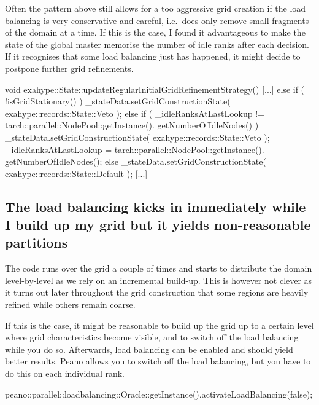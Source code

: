 \begin{remark}
Often the pattern above still allows for a too aggressive grid creation if the
load balancing is very conservative and careful, i.e.~does only remove small
fragments of the domain at a time. If this is the case, I found it advantageous
to make the state of the global master memorise the number of idle ranks after
each decision. If it recognises that some load balancing just has happened, it
might decide to postpone further grid refinements.
  \begin{code}
void exahype::State::updateRegularInitialGridRefinementStrategy() {
  [...]
  else if ( !isGridStationary() ) {
    _stateData.setGridConstructionState( exahype::records::State::Veto );
  }
  else if (
    _idleRanksAtLastLookup != tarch::parallel::NodePool::getInstance().
      getNumberOfIdleNodes()
  ) {
    _stateData.setGridConstructionState( exahype::records::State::Veto );
    _idleRanksAtLastLookup = tarch::parallel::NodePool::getInstance().
      getNumberOfIdleNodes();
  }
  else {
    _stateData.setGridConstructionState( exahype::records::State::Default );
  }
  [...]
}

  \end{code}
\end{remark}

\subsection{The load balancing kicks in immediately while I build up my grid but it
yields non-reasonable partitions}


\begin{smell}
The code runs over the grid a couple of times and starts to distribute the
domain level-by-level as we rely on an incremental build-up. This is however not
clever as it turns out later throughout the grid construction that some regions
are heavily refined while others remain coarse.
\end{smell}


\noindent
If this is the case, it might be reasonable to build up the grid up to a certain
level where grid characteristics become visible, and to switch off the load
balancing while you do so.
Afterwards, load balancing can be enabled and should yield better results. 
Peano allows you to switch off the load balancing, but you have to do this on
each individual rank. 

\begin{code}
peano::parallel::loadbalancing::Oracle::getInstance().activateLoadBalancing(false);
\end{code}



